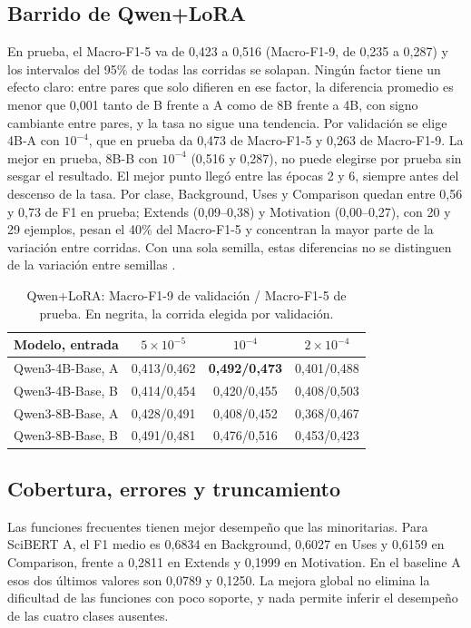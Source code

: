 \documentclass[10pt,a4paper,twocolumn]{article}
\begin{document}
\subsection{Barrido de Qwen+LoRA}
En prueba, el Macro-F1-5 va de 0,423 a 0,516 (Macro-F1-9, de 0,235 a 0,287) y los intervalos del 95\% de todas las corridas se solapan. Ningún factor tiene un efecto claro: entre pares que solo difieren en ese factor, la diferencia promedio es menor que 0,001 tanto de B frente a A como de 8B frente a 4B, con signo cambiante entre pares, y la tasa no sigue una tendencia. Por validación se elige 4B-A con $10^{-4}$, que en prueba da 0,473 de Macro-F1-5 y 0,263 de Macro-F1-9. La mejor en prueba, 8B-B con $10^{-4}$ (0,516 y 0,287), no puede elegirse por prueba sin sesgar el resultado. El mejor punto llegó entre las épocas 2 y 6, siempre antes del descenso de la tasa. Por clase, Background, Uses y Comparison quedan entre 0,56 y 0,73 de F1 en prueba; Extends (0,09--0,38) y Motivation (0,00--0,27), con 20 y 29 ejemplos, pesan el 40\% del Macro-F1-5 y concentran la mayor parte de la variación entre corridas. Con una sola semilla, estas diferencias no se distinguen de la variación entre semillas \cite{dodge}.

\begin{table}[t]
\centering\footnotesize
\caption{Qwen+LoRA: Macro-F1-9 de validación / Macro-F1-5 de prueba. En negrita, la corrida elegida por validación.}\label{tab:qwen}
\setlength{\tabcolsep}{3pt}
\begin{tabular}{lccc}\toprule
Modelo, entrada & $5\times10^{-5}$ & $10^{-4}$ & $2\times10^{-4}$\\\midrule
Qwen3-4B-Base, A & 0,413/0,462 & \textbf{0,492/0,473} & 0,401/0,488\\
Qwen3-4B-Base, B & 0,414/0,454 & 0,420/0,455 & 0,408/0,503\\
Qwen3-8B-Base, A & 0,428/0,491 & 0,408/0,452 & 0,368/0,467\\
Qwen3-8B-Base, B & 0,491/0,481 & 0,476/0,516 & 0,453/0,423\\\bottomrule
\end{tabular}
\end{table}

\subsection{Cobertura, errores y truncamiento}
Las funciones frecuentes tienen mejor desempeño que las minoritarias. Para SciBERT A, el F1 medio es 0,6834 en Background, 0,6027 en Uses y 0,6159 en Comparison, frente a 0,2811 en Extends y 0,1999 en Motivation. En el baseline A esos dos últimos valores son 0,0789 y 0,1250. La mejora global no elimina la dificultad de las funciones con poco soporte, y nada permite inferir el desempeño de las cuatro clases ausentes.
\end{document}
